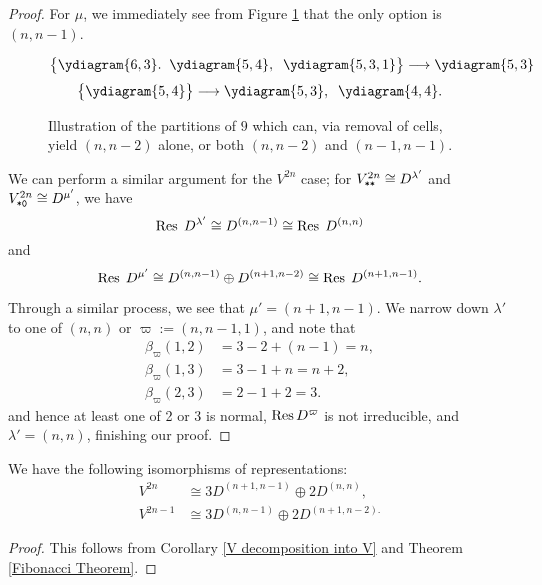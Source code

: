 \documentclass{amsart}
\begin{document}
\begin{proof}
  For $\mu$, we immediately see from Figure \ref{OddRes} that the only option is $(n,n-1)$.
  \begin{figure}
  \[
      \cbr{
        \begin{gathered}
        \ydiagram{6,3}. \; \;
        \ydiagram{5,4}, \; \;
        \ydiagram{5,3,1}
      \end{gathered} 
    }\longrightarrow \begin{gathered}
      \ydiagram{5,3}
  \end{gathered}\]
      \[\cbr{
        \begin{gathered}
          \ydiagram{5,4}
        \end{gathered}
      }\longrightarrow
      \begin{gathered}
        \ydiagram{5,3},\;\;
        \ydiagram{4,4}.
      \end{gathered}
    \]
      \caption{
      Illustration of the partitions of $9$ which can, via removal of cells, yield $(n,n-2)$ alone, or both $(n,n-2)$ and $(n-1,n-1)$.
    }\label{OddRes}
\end{figure}  
  
  We can perform a similar argument for the $V^{2n}$ case;
  for $V^{2n}_{\texttt{*}\texttt{*}} \cong D^{\lambda'}$ and $V^{2n}_{\texttt{*}\texttt{0}} \cong D^{\mu'}$, we have
  \[\operatorname{Res} \; D^{\lambda'} \cong D^{(n,n-1)} \cong \operatorname{Res} \; D^{(n,n)}\] and 
  \[\operatorname{Res} \; D^{\mu'} \cong D^{(n,n-1)} \oplus D^{(n+1,n-2)} \cong \operatorname{Res} \; D^{(n+1,n-1)}.\]
  
  Through a similar process, we see that $\mu' = (n+1,n-1)$.
  We narrow down $\lambda'$ to one of $(n,n)$ or $\varpi := (n,n-1,1)$, and note that
  \begin{align*} 
    \beta_\varpi(1,2) &= 3 - 2 + (n-1) = n,\\
    \beta_\varpi(1,3) &= 3 - 1 + n = n+2,\\
    \beta_\varpi(2,3) &= 2 - 1 + 2 = 3.
  \end{align*}
  and hence at least one of 2 or 3 is normal, $\operatorname{Res} D^{\varpi}$ is not irreducible, and $\lambda' = (n,n)$, finishing our proof.
\end{proof}
\begin{corollary}
  We have the following isomorphisms of representations:
  \begin{align*} 
    V^{2n} &\cong 3D^{(n+1,n-1)} \oplus 2D^{(n,n)},\\
    V^{2n - 1} &\cong 3D^{(n,n-1)} \oplus 2D^{(n+1,n-2).}
  \end{align*}
\end{corollary}
\begin{proof}
  This follows from Corollary \ref{V decomposition into V} and Theorem \ref{Fibonacci Theorem}.
\end{proof}
\end{document}
